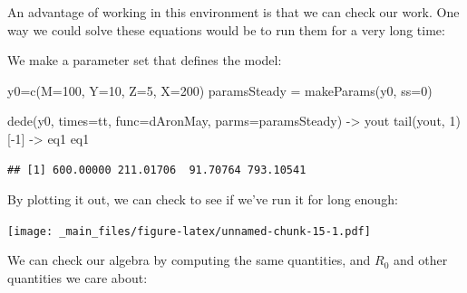 \documentclass[
]{book}
\newenvironment{Shaded}{\begin{snugshade}}{\end{snugshade}}
\newcommand{\AttributeTok}[1]{\textcolor[rgb]{0.77,0.63,0.00}{#1}}
\newcommand{\DecValTok}[1]{\textcolor[rgb]{0.00,0.00,0.81}{#1}}
\newcommand{\FunctionTok}[1]{\textcolor[rgb]{0.00,0.00,0.00}{#1}}
\newcommand{\NormalTok}[1]{#1}
\newcommand{\OtherTok}[1]{\textcolor[rgb]{0.56,0.35,0.01}{#1}}
\newcommand{\SpecialCharTok}[1]{\textcolor[rgb]{0.00,0.00,0.00}{#1}}
\begin{document}
An advantage of working in this environment is that we can check our work. One way we could solve these equations would be to run them for a very long time:

We make a parameter set that defines the model:

\begin{Shaded}
\begin{Highlighting}[]
\NormalTok{y0}\OtherTok{=}\FunctionTok{c}\NormalTok{(}\AttributeTok{M=}\DecValTok{100}\NormalTok{, }\AttributeTok{Y=}\DecValTok{10}\NormalTok{, }\AttributeTok{Z=}\DecValTok{5}\NormalTok{, }\AttributeTok{X=}\DecValTok{200}\NormalTok{)}
\NormalTok{paramsSteady }\OtherTok{=} \FunctionTok{makeParams}\NormalTok{(y0, }\AttributeTok{ss=}\DecValTok{0}\NormalTok{)}
\end{Highlighting}
\end{Shaded}

\begin{Shaded}
\begin{Highlighting}[]
\FunctionTok{dede}\NormalTok{(y0, }\AttributeTok{times=}\NormalTok{tt, }\AttributeTok{func=}\NormalTok{dAronMay, }\AttributeTok{parms=}\NormalTok{paramsSteady) }\OtherTok{{-}\textgreater{}}\NormalTok{ yout}
\FunctionTok{tail}\NormalTok{(yout, }\DecValTok{1}\NormalTok{)[}\SpecialCharTok{{-}}\DecValTok{1}\NormalTok{] }\OtherTok{{-}\textgreater{}}\NormalTok{ eq1 }
\NormalTok{eq1}
\end{Highlighting}
\end{Shaded}

\begin{verbatim}
## [1] 600.00000 211.01706  91.70764 793.10541
\end{verbatim}

By plotting it out, we can check to see if we've run it for long enough:

\texttt{[image: \_main\_files/figure-latex/unnamed-chunk-15-1.pdf]}

We can check our algebra by computing the same quantities, and \(R_0\) and other quantities we care about:
\end{document}
